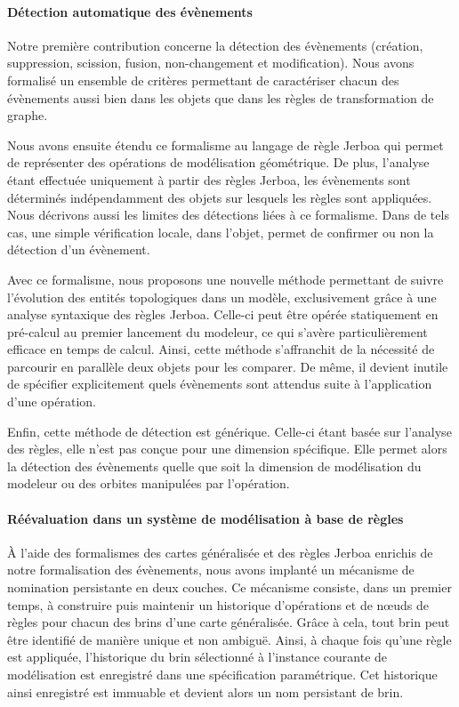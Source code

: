 \paragraph*{Détection automatique des évènements}



Notre première contribution concerne la détection des évènements (création,
suppression, scission, fusion, non-changement et modification). %
Nous avons formalisé un ensemble de critères permettant de caractériser chacun
des évènements aussi bien dans les objets que dans les règles de transformation
de graphe. %

Nous avons ensuite étendu ce formalisme au langage de règle Jerboa qui permet de
représenter des opérations de modélisation géométrique. %
De plus, l'analyse étant effectuée uniquement à partir des règles Jerboa, les
évènements sont déterminés indépendamment des objets sur lesquels les règles
sont appliquées. %
Nous décrivons aussi les limites des détections liées à ce formalisme. %
Dans de tels cas, une simple vérification locale, dans l'objet, permet de
confirmer ou non la détection d'un évènement. %

Avec ce formalisme, nous proposons une nouvelle méthode permettant de suivre
l'évolution des entités topologiques dans un modèle, exclusivement grâce à une
analyse syntaxique des règles Jerboa. %
Celle-ci peut être opérée statiquement en pré-calcul au premier lancement du
modeleur, ce qui s'avère particulièrement efficace en temps de calcul. %
Ainsi, cette méthode s'affranchit de la nécessité de parcourir en parallèle
deux objets pour les comparer. %
De même, il devient inutile de spécifier explicitement quels évènements sont
attendus suite à l'application d'une opération. %

Enfin, cette méthode de détection est générique. %
Celle-ci étant basée sur l'analyse des règles, elle n'est pas conçue pour une
dimension spécifique. %
Elle permet alors la détection des évènements quelle que soit la
dimension de modélisation du modeleur ou des orbites manipulées par l'opération. %



\paragraph*{Réévaluation dans un système de modélisation à base de règles}



À l'aide des formalismes des cartes généralisée et des règles Jerboa enrichis de
notre formalisation des évènements, nous avons implanté un mécanisme de
nomination persistante en deux couches. %
Ce mécanisme consiste, dans un premier temps, à construire puis maintenir un
historique d'opérations et de n\oe uds de règles pour chacun des brins d'une
carte généralisée. %
Grâce à cela, tout brin peut être identifié de manière unique et non ambiguë. %
Ainsi, à chaque fois qu'une règle est appliquée, l'historique du brin
sélectionné à l'instance courante de modélisation est enregistré dans une
spécification paramétrique. %
Cet historique ainsi enregistré est immuable et devient alors un nom persistant de
brin. %

